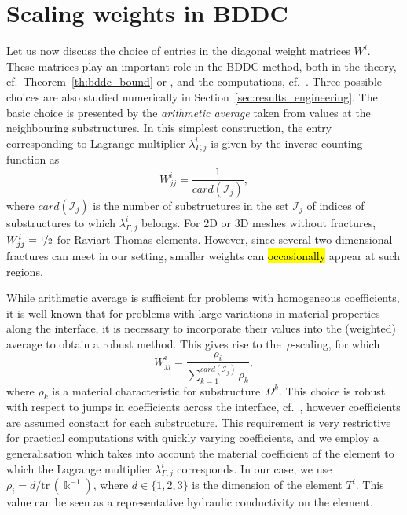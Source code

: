 \section{Scaling weights in BDDC}
\label{sec:scaling}

Let us now discuss the choice of entries in the diagonal weight matrices $W^{i}%
$. These matrices play an
important role in the BDDC method, both in the theory,
cf.~Theorem~\ref{th:bddc_bound} or
\cite{Tu-2007-BAF,Mandel-2007-BFM,Mandel-2003-CBD}, and the
computations, cf.~\cite{Klawonn-2008-AFA,Certikova-2013-SIW}. Three possible
choices are also studied numerically in Section~\ref{sec:results_engineering}.
The basic choice is presented by the \emph{arithmetic average} taken from
values at the neighbouring substructures. In this simplest construction, the
entry corresponding to Lagrange multiplier $\lambda_{\Gamma,j}^{i}$ is given
by the inverse counting function as
\begin{equation}
W_{jj}^{i}=\frac{1}{card(\mathcal{I}_{j})}, \label{eq:scaling_arithmetic}%
\end{equation}
where $card(\mathcal{I}_{j})$ is the number of substructures in the set
$\mathcal{I}_{j}$ of indices of substructures to which $\lambda_{\Gamma,j}%
^{i}$ belongs. For 2D or 3D meshes without fractures, $W_{jj}^{i}=\nicefrac{1}{2}$
for Raviart-Thomas elements. However, since several two-dimensional fractures
can meet in our setting, smaller weights can \hl{occasionally}
appear at such regions.

While arithmetic average is sufficient for problems with homogeneous
coefficients, it is well known that for problems with large variations in
material properties along the interface, it is necessary to incorporate their
values into the (weighted) average to obtain a robust method. This gives rise to
the~$\rho$-scaling, for which
\begin{equation}
\label{eq:scaling_rho}W^{i}_{jj} = \frac{\rho_{i}}{\sum_{k = 1}%
^{card(\mathcal{I}_{j})} \rho_{k}},
\end{equation}
where $\rho_{k}$ is a material characteristic for substructure~$\Omega^{k}$.
This choice is robust with respect to jumps in coefficients across the interface,
cf.~\cite{Tu-2007-BAF, Toselli-2005-DDM}, however coefficients are assumed
constant for each substructure. This requirement is very restrictive for
practical computations with quickly varying coefficients, and we employ a
generalisation which takes into account the material coefficient of the
element to which the Lagrange multiplier $\lambda_{\Gamma,j}^{i}$ corresponds.
In our case, we use $\rho_{i} = d/\mbox{tr}\,(\Bbbk^{-1})$, where $d\in\{1,2,3\}$ is the
dimension of the element $T^{i}$. 
This value can be seen as a representative hydraulic conductivity on the element.

